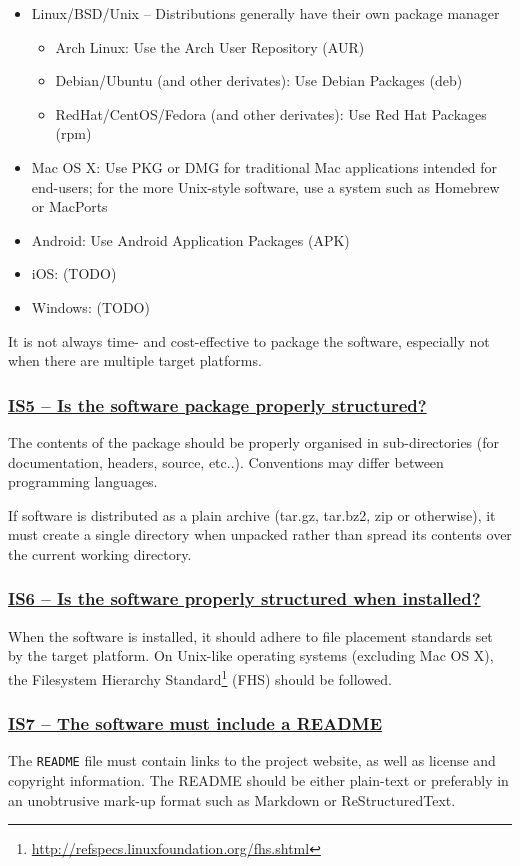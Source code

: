 \documentclass[a4paper,11pt]{article}
\newcommand{\indicator}[1]{\subsubsection*{\underline{#1}}}
\begin{document}
\begin{itemize}
    \item Linux/BSD/Unix -- Distributions generally have their own package manager
    \begin{itemize}
        \item Arch Linux: Use the Arch User Repository (AUR)
        \item Debian/Ubuntu (and other derivates): Use Debian Packages (deb)
        \item RedHat/CentOS/Fedora (and other derivates): Use Red Hat Packages (rpm)
    \end{itemize}
    \item Mac OS X: Use PKG or DMG for traditional Mac applications intended for end-users; for the more Unix-style
        software, use a system such as Homebrew or MacPorts
    \item Android: Use Android Application Packages (APK)
    \item iOS: (TODO) 
    \item Windows: (TODO) 
\end{itemize}

It is not always time- and cost-effective to package the software, especially not
when there are multiple target platforms. 

\indicator{IS5 -- Is the software package properly structured?}

The contents of the package should be properly organised in sub-directories
(for documentation, headers, source, etc..). Conventions may differ between
programming languages.

If software is distributed as a plain archive (tar.gz, tar.bz2, zip or otherwise),
it must create a single directory when unpacked rather than spread its contents
over the current working directory.

\indicator{IS6 -- Is the software properly structured when installed?}

When the software is installed, it should adhere to file placement standards set
by the target platform. On Unix-like operating systems (excluding Mac OS X), the Filesystem
Hierarchy Standard\footnote{\url{http://refspecs.linuxfoundation.org/fhs.shtml}} (FHS) should be followed.

\indicator{IS7 -- The software must include a README}

The \texttt{README} file must contain links to the project website, as well as
license and copyright information. The README should be either plain-text or
preferably in an unobtrusive mark-up format such as Markdown or ReStructuredText.
\end{document}
